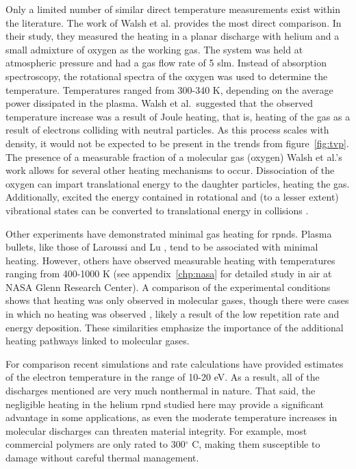 Only a limited number of similar direct temperature measurements exist within
the literature. The work of Walsh et al. \cite{Walsh2010} provides the most
direct comparison. In their study, they measured the heating in a planar
discharge with helium and a small admixture of oxygen as the working gas. The
system was held at atmospheric pressure and had a gas flow rate of 5 slm.
Instead of absorption spectroscopy, the rotational spectra of the oxygen was
used to determine the temperature. Temperatures ranged from 300-340 K, depending
on the average power dissipated in the plasma. Walsh et al.\ suggested that the
observed temperature increase was a result of Joule heating, that is, heating of
the gas as a result of electrons colliding with neutral particles. As this
process scales with density, it would not be expected to be present in the
trends from figure~\ref{fig:tvp}. The presence of a measurable fraction of a
molecular gas (oxygen) Walsh et al.'s work allows for several other heating
mechanisms to occur. Dissociation of the oxygen can impart translational energy
to the daughter particles, heating the gas. Additionally, excited the energy
contained in rotational and (to a lesser extent) vibrational states can be
converted to translational energy in collisions \cite{Kiehlbauch2003}.

Other experiments have demonstrated minimal gas heating for \acs{rpnd}s. Plasma
bullets, like those of Laroussi and Lu \cite{Laroussi2005, Lu2006}, tend to be
associated with minimal heating. However, others have observed measurable
heating with temperatures ranging from 400-1000 K \cite{Pai2009, Popov2011,
Zuzeek2010, Aleksandrov2010} (see appendix~\ref{chp:nasa} for detailed study in
air at NASA Glenn Research Center). A comparison of the experimental conditions
shows that heating was only observed in molecular gases, though there were cases
in which no heating was observed \cite{Pancheshnyi2000}, likely a result of the
low repetition rate and energy deposition. These similarities emphasize the
importance of the additional heating pathways linked to molecular gases.

For comparison recent simulations and rate calculations \cite{Takashima2011,
Aleksandrov2007} have provided estimates of the electron temperature in the
range of 10-20 eV. As a result, all of the discharges mentioned are very much
nonthermal in nature. That said, the negligible heating in the helium \acs{rpnd}
studied here may provide a significant advantage in some applications, as even
the moderate temperature increases in molecular discharges can threaten material
integrity. For example, most commercial polymers are only rated to 300$^\circ$
C, making them susceptible to damage without careful thermal management.

